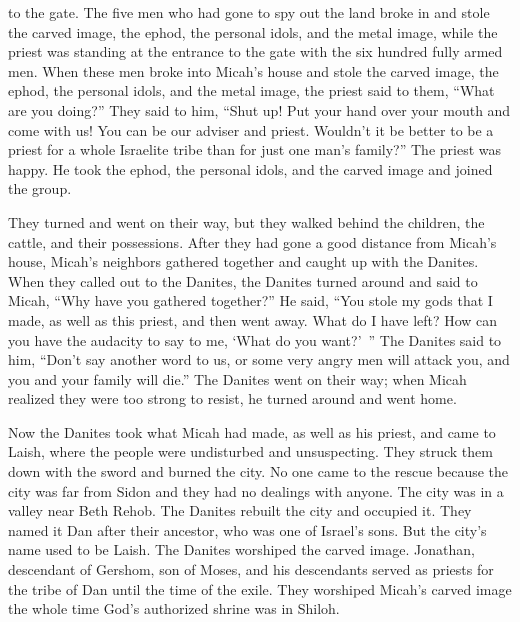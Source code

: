 {to the gate.
The five
men
who had gone
to spy out
the land
broke in
and stole
the carved image,
the ephod,
the personal
idols,
and the metal image,
while the priest
was standing
at the entrance
to the gate
with the six
hundred
fully
armed
men.
When these
men broke into
Micah’s
house
and stole
the carved image,
the ephod,
the personal idols,
and the metal image,
the priest
said
to
them, “What
are you
doing?”
They said
to him, “Shut up! Put
your hand
over
your mouth
and come
with
us! You can be
our adviser
and priest.
Wouldn’t it be better
to be
a priest
for a whole
Israelite
tribe
than for just
one
man’s
family?”
The priest
was happy.
He took
the ephod,
the personal idols,
and the carved image
and joined
the group.
\par }{\PP {}They turned
and went
on their way, but they walked
behind the children,
the cattle,
and their possessions.
After they
had gone a good distance
from Micah’s
house,
Micah’s
neighbors gathered together
and caught
up with the Danites.
When
they called
out
to
the Danites, the Danites
turned
around and said
to Micah,
“Why
have you gathered
together?”
He said,
“You stole
my gods
that
I made,
as well as this priest,
and then went
away. What
do I have left? How
can you have
the audacity
to say
to
me, ‘What do you want?’ ”
The Danites
said
to
him, “Don’t
say another word
to
us, or
some very angry
men
will attack
you, and you and your family
will die.”
The Danites
went
on their way;
when
Micah
realized
they were
too strong
to resist,
he turned
around and went
home.
\par }{\PP {}Now the
Danites took
what Micah
had
made,
as well as his priest,
and came
to Laish,
where the people
were undisturbed
and unsuspecting.
They struck
them down with the sword
and burned
the city.
No one
came to the rescue
because
the city was far
from Sidon
and they had no
dealings
with
anyone.
The city was
in a valley
near Beth Rehob.
The Danites rebuilt
the city
and occupied it.
They named
it Dan
after their ancestor,
who
was one of Israel’s
sons.
But
the city’s
name
used to be Laish.
The
Danites
worshiped
the carved image.
Jonathan,
descendant
of Gershom,
son
of Moses,
and his descendants
served
as priests
for the tribe
of Dan
until
the time
of the exile.
They worshiped
Micah’s
carved
image
the whole
time
God’s
authorized
shrine
was in Shiloh.

}

